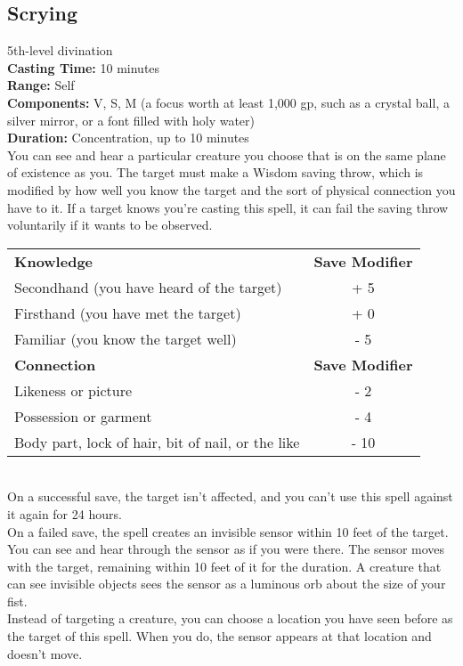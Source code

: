 \documentclass[11pt, A4paper, english]{article}
\begin{document}
		\subsection{Scrying}
5th-level divination \\
\textbf{Casting Time:} 10 minutes \\
\textbf{Range:} Self \\
\textbf{Components:} V, S, M (a focus worth at least 1,000 gp, such as a crystal ball, a silver mirror, or a font filled with holy water) \\
\textbf{Duration:} Concentration, up to 10 minutes \\
You can see and hear a particular creature you choose that is on the same plane of existence as you. The target must make a Wisdom saving throw, which is modified by how well you know the target and the sort of physical connection you have to it. If a target knows you're casting this spell, it can fail the saving throw voluntarily if it wants to be observed. \\
			\begin{tabular}{lc}
\textbf{Knowledge} & \textbf{Save Modifier} \\
Secondhand (you have heard of the target) & + 5 \\
Firsthand (you have met the target) & + 0 \\
Familiar (you know the target well) & - 5 \\
\textbf{Connection} & \textbf{Save Modifier} \\
Likeness or picture & - 2 \\
Possession or garment & - 4 \\
Body part, lock of hair, bit of nail, or the like & - 10
			\end{tabular} \\
On a successful save, the target isn't affected, and you can’t use this spell against it again for 24 hours. \\
On a failed save, the spell creates an invisible sensor within 10 feet of the target. You can see and hear through the sensor as if you were there. The sensor moves with the target, remaining within 10 feet of it for the duration. A creature that can see invisible objects sees the sensor as a luminous orb about the size of your fist. \\
Instead of targeting a creature, you can choose a location you have seen before as the target of this spell. When you do, the sensor appears at that location and doesn't move.
\end{document}
